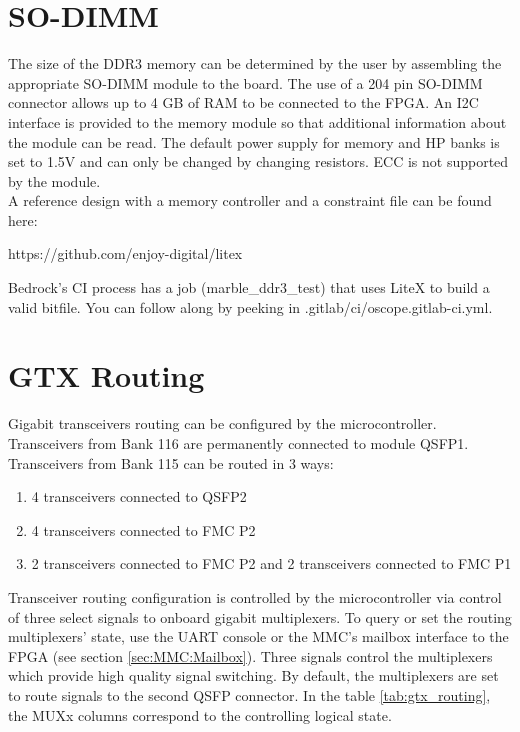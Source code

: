 \documentclass[12pt,oneside,a4]{article}
\begin{document}
\section{SO-DIMM}

The size of the DDR3 memory can be determined by the user by assembling the appropriate SO-DIMM module to the board. The use of a 204 pin SO-DIMM connector allows up to 4 GB of RAM to be connected to the FPGA. An I2C interface is provided to the memory module so that additional information about the module can be read. The default power supply for memory and HP banks is set to 1.5V and can only be changed by changing resistors. ECC is not supported by the module.\\

A reference design with a memory controller and a constraint file can be found here:
\begin{leftbar}
https://github.com/enjoy-digital/litex
\end{leftbar}
Bedrock's CI process has a job (marble\_ddr3\_test) that uses LiteX to build a valid bitfile.
You can follow along by peeking in .gitlab/ci/oscope.gitlab-ci.yml.

\section{GTX Routing}
Gigabit transceivers routing can be configured by the microcontroller. Transceivers from Bank 116 are permanently connected to module QSFP1. Transceivers from Bank 115 can be routed in 3 ways:
\begin{enumerate}
    \item 4 transceivers connected to QSFP2
    \item 4 transceivers connected to FMC P2
    \item 2 transceivers connected to FMC P2 and 2 transceivers connected to FMC P1
\end{enumerate}

Transceiver routing configuration is controlled by the microcontroller via control of three select signals to onboard gigabit multiplexers.
To query or set the routing multiplexers' state, use the UART console or the MMC's mailbox interface to the FPGA (see section \ref{sec:MMC:Mailbox}).
Three signals control the multiplexers which provide high quality signal switching.
By default, the multiplexers are set to route signals to the second QSFP connector.
In the table \ref{tab:gtx_routing}, the MUXx columns correspond to the controlling logical state.
\end{document}

